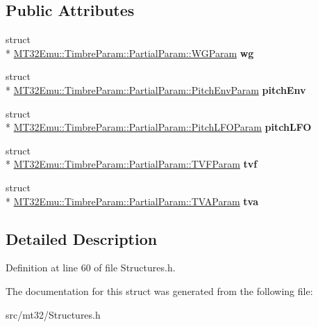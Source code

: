 \subsection*{Public Attributes}
\begin{DoxyCompactItemize}
\item 
\hypertarget{structMT32Emu_1_1TimbreParam_1_1PartialParam_ab94e1fab497d42111991a1cc4d3d5f88}{struct \\*
\hyperlink{structMT32Emu_1_1TimbreParam_1_1PartialParam_1_1WGParam}{M\-T32\-Emu\-::\-Timbre\-Param\-::\-Partial\-Param\-::\-W\-G\-Param} {\bfseries wg}}\label{structMT32Emu_1_1TimbreParam_1_1PartialParam_ab94e1fab497d42111991a1cc4d3d5f88}

\item 
\hypertarget{structMT32Emu_1_1TimbreParam_1_1PartialParam_adc30c4940d60f687411dc52b57787710}{struct \\*
\hyperlink{structMT32Emu_1_1TimbreParam_1_1PartialParam_1_1PitchEnvParam}{M\-T32\-Emu\-::\-Timbre\-Param\-::\-Partial\-Param\-::\-Pitch\-Env\-Param} {\bfseries pitch\-Env}}\label{structMT32Emu_1_1TimbreParam_1_1PartialParam_adc30c4940d60f687411dc52b57787710}

\item 
\hypertarget{structMT32Emu_1_1TimbreParam_1_1PartialParam_aa6e6c450d6ce19409dc649e31f8b45dd}{struct \\*
\hyperlink{structMT32Emu_1_1TimbreParam_1_1PartialParam_1_1PitchLFOParam}{M\-T32\-Emu\-::\-Timbre\-Param\-::\-Partial\-Param\-::\-Pitch\-L\-F\-O\-Param} {\bfseries pitch\-L\-F\-O}}\label{structMT32Emu_1_1TimbreParam_1_1PartialParam_aa6e6c450d6ce19409dc649e31f8b45dd}

\item 
\hypertarget{structMT32Emu_1_1TimbreParam_1_1PartialParam_a088c7bfa3252fecba6848b18b8cf7294}{struct \\*
\hyperlink{structMT32Emu_1_1TimbreParam_1_1PartialParam_1_1TVFParam}{M\-T32\-Emu\-::\-Timbre\-Param\-::\-Partial\-Param\-::\-T\-V\-F\-Param} {\bfseries tvf}}\label{structMT32Emu_1_1TimbreParam_1_1PartialParam_a088c7bfa3252fecba6848b18b8cf7294}

\item 
\hypertarget{structMT32Emu_1_1TimbreParam_1_1PartialParam_ac817d06db507bdb4bc5f8a503a75a746}{struct \\*
\hyperlink{structMT32Emu_1_1TimbreParam_1_1PartialParam_1_1TVAParam}{M\-T32\-Emu\-::\-Timbre\-Param\-::\-Partial\-Param\-::\-T\-V\-A\-Param} {\bfseries tva}}\label{structMT32Emu_1_1TimbreParam_1_1PartialParam_ac817d06db507bdb4bc5f8a503a75a746}

\end{DoxyCompactItemize}


\subsection{Detailed Description}


Definition at line 60 of file Structures.\-h.



The documentation for this struct was generated from the following file\-:\begin{DoxyCompactItemize}
\item 
src/mt32/Structures.\-h\end{DoxyCompactItemize}
